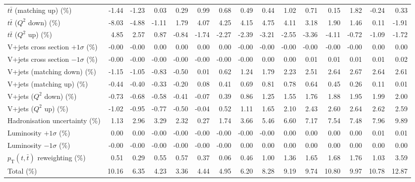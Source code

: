\begin{table}[htbp]
{\begin{tabular}{lrrrrrrrrrrrrrr}
$t\bar{t}$ (matching up) (\%) & -1.44 & -1.23 & 0.03 & 0.29 & 0.99 & 0.68 & 0.49 & 0.44 & 1.02 & 0.71 & 0.15 & 1.82 & -0.24 & 0.33 \\ 
$t\bar{t}$ ($Q^{2}$ down) (\%) & -8.03 & -4.88 & -1.11 & 1.79 & 4.07 & 4.25 & 4.15 & 4.75 & 4.11 & 3.18 & 1.90 & 1.46 & 0.11 & -1.91 \\ 
$t\bar{t}$ ($Q^{2}$ up) (\%) & 4.85 & 2.57 & 0.87 & -0.84 & -1.74 & -2.27 & -2.39 & -3.21 & -2.55 & -3.36 & -4.11 & -0.72 & -1.09 & -1.72 \\ 
V+jets cross section \ensuremath{+1\sigma} (\%) & -0.00 & -0.00 & 0.00 & 0.00 & 0.00 & 0.00 & -0.00 & -0.00 & -0.00 & -0.00 & -0.00 & -0.00 & 0.00 & 0.00 \\ 
V+jets cross section \ensuremath{-1\sigma} (\%) & -0.00 & -0.00 & -0.00 & -0.00 & -0.00 & -0.00 & -0.00 & 0.00 & 0.00 & 0.01 & 0.01 & 0.01 & 0.01 & 0.02 \\ 
V+jets (matching down) (\%) & -1.15 & -1.05 & -0.83 & -0.50 & 0.01 & 0.62 & 1.24 & 1.79 & 2.23 & 2.51 & 2.64 & 2.67 & 2.64 & 2.61 \\ 
V+jets (matching up) (\%) & -0.44 & -0.40 & -0.33 & -0.20 & 0.08 & 0.41 & 0.69 & 0.81 & 0.78 & 0.64 & 0.45 & 0.26 & 0.11 & 0.01 \\ 
V+jets ($Q^{2}$ down) (\%) & -0.73 & -0.68 & -0.58 & -0.41 & -0.07 & 0.39 & 0.86 & 1.25 & 1.55 & 1.76 & 1.88 & 1.95 & 1.99 & 2.00 \\ 
V+jets ($Q^{2}$ up) (\%) & -1.02 & -0.95 & -0.77 & -0.50 & -0.04 & 0.52 & 1.11 & 1.65 & 2.10 & 2.43 & 2.60 & 2.64 & 2.62 & 2.59 \\ 
Hadronisation uncertainty (\%) & 1.13 & 2.96 & 3.29 & 2.32 & 0.27 & 1.74 & 3.66 & 5.46 & 6.60 & 7.17 & 7.54 & 7.48 & 7.96 & 9.89 \\ 
Luminosity $+1\sigma$ (\%) & 0.00 & 0.00 & -0.00 & -0.00 & -0.00 & -0.00 & -0.00 & -0.00 & 0.00 & 0.00 & 0.00 & 0.00 & 0.01 & 0.01 \\ 
Luminosity $-1\sigma$ (\%) & -0.00 & -0.00 & -0.00 & -0.00 & -0.00 & -0.00 & 0.00 & 0.00 & 0.00 & 0.00 & 0.00 & 0.00 & 0.00 & 0.00 \\ 
$p_\mathrm{T}(t,\bar{t})$ reweighting (\%) & 0.51 & 0.29 & 0.55 & 0.57 & 0.37 & 0.06 & 0.46 & 1.00 & 1.36 & 1.65 & 1.68 & 1.76 & 1.03 & 3.59 \\ 
\hline 
Total (\%) & 10.16  & 6.35  & 4.23  & 3.36  & 4.44  & 4.95  & 6.20  & 8.28  & 9.19  & 9.74  & 10.80  & 9.97  & 10.78  & 12.87 \\ 
\hline 
\end{tabular}
}
\end{table}

